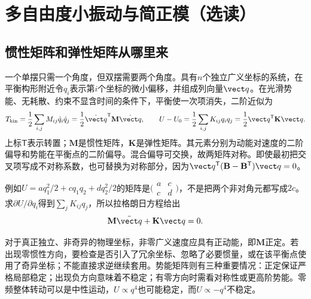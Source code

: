 \section{多自由度小振动与简正模（选读）}\label{ch10:sec:modes}
\subsection{惯性矩阵和弹性矩阵从哪里来}
一个单摆只需一个角度，但双摆需要两个角度。具有$n$个独立广义坐标的系统，在平衡构形附近令$q_i$表示第$i$个坐标的微小偏移，并组成列向量$\vect q$。在光滑势能、无耗散、约束不显含时间的条件下，平衡使一次项消失，二阶近似为
\begin{equation}\label{ch10:eq:quadratic}
 T_{\rm kin}=\frac12\sum_{i,j}M_{ij}\dot q_i\dot q_j
 =\frac12\dot{\vect q}^{\mathsf T}\mathbf M\dot{\vect q},\qquad
 U-U_0=\frac12\sum_{i,j}K_{ij}q_iq_j
 =\frac12\vect q^{\mathsf T}\mathbf K\vect q.
\end{equation}
上标$\mathsf T$表示转置；$\mathbf M$是惯性矩阵，$\mathbf K$是弹性矩阵。其元素分别为动能对速度的二阶偏导和势能在平衡点的二阶偏导。混合偏导可交换，故两矩阵对称。即使最初把交叉项写成不对称系数，也可替换为对称部分，因为$\vect q^{\mathsf T}(\mathbf B-\mathbf B^{\mathsf T})\vect q=0$。

例如$U=aq_1^2/2+cq_1q_2+dq_2^2/2$的矩阵是$\bigl(\begin{smallmatrix}a&c\\c&d\end{smallmatrix}\bigr)$，不是把两个非对角元都写成$2c$。求$\partial U/\partial q_i$得到$\sum_jK_{ij}q_j$，所以拉格朗日方程给出
\begin{equation}\label{ch10:eq:matrix-motion}
 \mathbf M\ddot{\vect q}+\mathbf K\vect q=0.
\end{equation}

对于真正独立、非奇异的物理坐标，非零广义速度应具有正动能，即$\mathbf M$正定。若出现零惯性方向，要检查是否引入了冗余坐标、忽略了必要惯量，或在该平衡点使用了奇异坐标；不能直接求逆继续套用。势能矩阵则有三种重要情况：正定保证严格局部稳定；出现负方向意味着不稳定；有零方向时需看对称性或更高阶势能。零频整体转动可以是中性运动，$U\propto q^4$也可能稳定，而$U\propto-q^4$不稳定。

